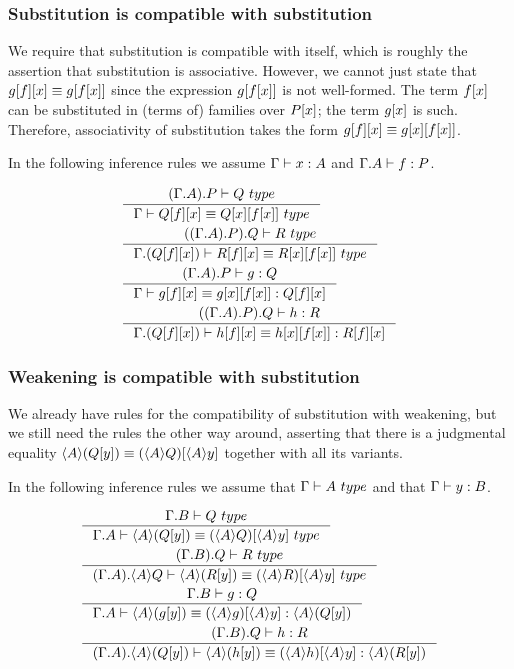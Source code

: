 \subsubsection{Substitution is compatible with substitution}

We require that substitution is compatible with itself, which is roughly the
assertion that substitution is associative. However, we cannot just state that
$\subst{x}{{f}{g}}\jdeq\subst{{x}{f}}{g}$ since the expression $\subst{{x}{f}}{g}$
is not well-formed. The term $\subst{x}{f}$ can be substituted in (terms of) families over
$\subst{x}{P}$; the term $\subst{x}{g}$ is such. Therefore, associativity of
substitution takes the form $\subst{x}{{f}{g}}\jdeq\subst{{x}{f}}{{x}{g}}$.

In the following inference rules we assume
$\jterm{\Gamma}{A}{x}$ and $\jterm{\ctxext{\Gamma}{A}}{P}{f}$.

\begin{align}
&\inference{\jtype{\ctxext{{\Gamma}{A}}{P}}{Q}}
{\jtypeeq{\Gamma}{\subst{x}{{f}{Q}}}{\subst{{x}{f}}{{x}{Q}}}}\\
&\inference{\jtype{\ctxext{{{\Gamma}{A}}{P}}{Q}}{R}}
{\jtypeeq{\ctxext{\Gamma}{\subst{x}{{f}{Q}}}}{\subst{x}{{f}{R}}}{\subst{{x}{f}}{{x}{R}}}}\\
&\inference{\jterm{\ctxext{{\Gamma}{A}}{P}}{Q}{g}}
{\jtermeq{\Gamma}{\subst{x}{{f}{Q}}}{\subst{x}{{f}{g}}}{\subst{{x}{f}}{{x}{g}}}}\\
&\inference{\jterm{\ctxext{{{\Gamma}{A}}{P}}{Q}}{R}{h}}
{\jtermeq{\ctxext{\Gamma}{\subst{x}{{f}{Q}}}}{\subst{x}{{f}{R}}}{\subst{x}{{f}{h}}}{\subst{{x}{f}}{{x}{h}}}}
\end{align}

\subsubsection{Weakening is compatible with substitution}
We already have rules for the compatibility of substitution with weakening, but
we still need the rules the other way around, asserting that there is a 
judgmental equality $\ctxwk{A}{\subst{y}{Q}}\jdeq\subst{\ctxwk{A}{y}}{\ctxwk{A}{Q}}$
together with all its variants.

In the following inference rules we assume that $\jtype{\Gamma}{A}$ and that
$\jterm{\Gamma}{B}{y}$.

\begin{align}
& \inference{\jtype{\ctxext{\Gamma}{B}}{Q}}{\jtypeeq{\ctxext{\Gamma}{A}}{\ctxwk{A}{\subst{y}{Q}}}{\subst{\ctxwk{A}{y}}{\ctxwk{A}{Q}}}}\\
& \inference{\jtype{\ctxext{{\Gamma}{B}}{Q}}{R}}{\jtypeeq{\ctxext{{\Gamma}{A}}{\ctxwk{A}{Q}}}{\ctxwk{A}{\subst{y}{R}}}{\subst{\ctxwk{A}{y}}{\ctxwk{A}{R}}}}\\
& \inference{\jterm{\ctxext{\Gamma}{B}}{Q}{g}}{\jtermeq{\ctxext{\Gamma}{A}}{\ctxwk{A}{\subst{y}{Q}}}{\ctxwk{A}{\subst{y}{g}}}{\subst{\ctxwk{A}{y}}{\ctxwk{A}{g}}}}\\
& \inference{\jterm{\ctxext{{\Gamma}{B}}{Q}}{R}{h}}{\jtermeq{\ctxext{{\Gamma}{A}}{\ctxwk{A}{\subst{y}{Q}}}}{\ctxwk{A}{\subst{y}{R}}}{\ctxwk{A}{\subst{y}{h}}}{\subst{\ctxwk{A}{y}}{\ctxwk{A}{h}}}}
\end{align}

